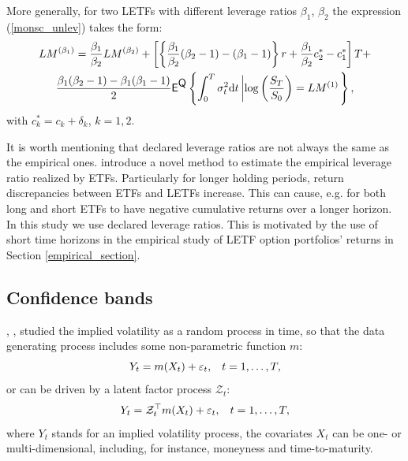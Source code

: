 \documentclass{rQUF2e}
\newcommand{\E}{\mathop{\mbox{\sf E}}}
\newcommand{\QQ}{\mathop{\mbox{\sf Q}}}
\theoremstyle{plain}
\theoremstyle{definition}
\begin{document}
	More generally, for two LETFs with different leverage ratios $\beta_1$, $\beta_2$ the expression (\ref{monsc_unlev}) takes the form:
	\begin{multline}
	LM^{(\beta_1)} = \frac{\beta_1}{\beta_2} LM^{(\beta_2)} + \left[ \left\{\frac{\beta_1}{\beta_2} (\beta_2-1) - (\beta_1-1) \right\} r + \frac{\beta_1}{\beta_2}c_2^{*} - c_1^{*} \right]T + \\ \frac{\beta_1(\beta_2-1) - \beta_1(\beta_1-1)}{2}  {\E}^{\QQ}\left\{ \int_{0}^{T}\sigma_t^2 \text{d} t \left| \log \left(\frac{S_T}{S_0}\right) = LM^{(1)} \right.\right\},
	\label{monsc}
	\end{multline}
	with $c^{*}_k = c_k + \delta_k$, $k = 1,2$.
	
	It is worth mentioning that declared leverage ratios are not always the same as the empirical ones. \citet{leung_santoli} introduce a novel method to estimate the empirical leverage ratio realized by ETFs. Particularly for longer holding periods, return discrepancies between ETFs and LETFs increase. This can cause, e.g. for both long and short ETFs to have negative cumulative returns over a longer horizon. In this study we use declared leverage ratios. This is motivated by the use of short time horizons in the empirical study of LETF option portfolios' returns in Section \ref{empirical_section}.
	
	
	\subsection{Confidence bands} 
	\label{confb}
	
	\citet{cont_da_fonseca}, \citet{fengler_haerdle_mammen}, \citet{park_et_al} studied the implied volatility as a random process in time, so that the data generating process includes some non-parametric function $m$:
	\begin{equation}
	Y_t = m(X_t) + \varepsilon_t, \hspace{3mm} t = 1,\ldots,T,
	\label{ivnonpar}
	\end{equation}
	or can be driven by a latent factor process $\mathcal{Z}_t$:
	\begin{equation}
	Y_t = \mathcal{Z}_t^{\top} m(X_t) + \varepsilon_t, \hspace{3mm} t = 1,\ldots,T,
	\label{ivnonpardsfm}
	\end{equation}
	where $Y_t$ stands for an implied volatility process, the covariates $X_t$ can be one- or multi-dimensional, including, for instance, moneyness and time-to-maturity.
	
\end{document}
